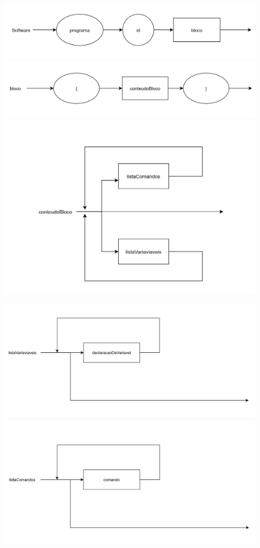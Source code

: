 \documentclass[11pt]{article}
\begin{document}
\begin{figure}[H]
   \includegraphics[]{grafos_sintaticos/software.png}
   \includegraphics[]{grafos_sintaticos/bloco.png}
   \includegraphics[]{grafos_sintaticos/conteudo_bloco.png}

   \includegraphics[]{grafos_sintaticos/lista_variaveis.png}
   \includegraphics[]{grafos_sintaticos/lista_comandos.png}
   
\end{figure}
\end{document}
